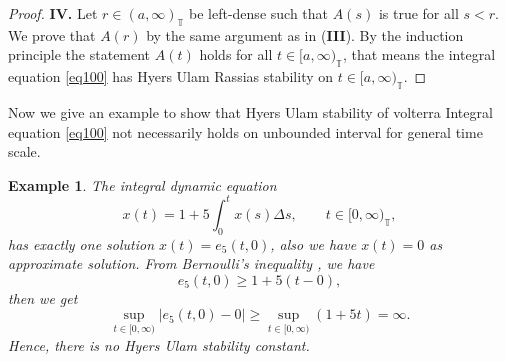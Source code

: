 \documentclass{article}
\newtheorem{exa}[thm]{Example}
\newcommand{\q}{\quad}
\begin{document}
\begin{proof}
\textbf{IV.} Let $r\in(a,\infty)_\mathbb{T}$ be left-dense such that $A(s)$ is true for all $s<r$. We prove that $A(r)$ by the same argument as in (\textbf{III}). By the induction principle the statement $A(t)$ holds for all $t\in[a,\infty)_\mathbb{T}$, that means the integral equation \eqref{eq100} has Hyers Ulam Rassias stability on $t\in[a,\infty)_\mathbb{T}$.
\end{proof}

Now we give an example to show that Hyers Ulam stability of volterra Integral equation \eqref{eq100} not necessarily holds on unbounded interval for general time scale.

\begin{exa}
The integral dynamic equation
$$
x(t)=1+5\int_0^tx(s)\Delta s, \q \q t\in [0,\infty)_\mathbb{T},
$$
has exactly one solution $x(t)=e_5(t,0)$, also we have $x(t)=0$ as approximate solution. From Bernoulli's inequality \cite{Boh1}, we have
$$
e_5(t,0)\geq 1+5(t-0),
$$
then we get
$$
\sup_{t\in [0,\infty)}|e_5(t,0)-0|\geq\sup_{t\in [0,\infty)}(1+5t)=\infty.
$$
Hence, there is no Hyers Ulam stability constant.
\end{exa}
\end{document}
